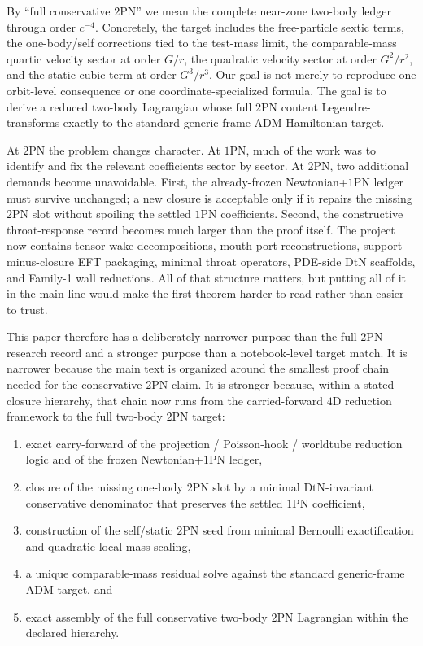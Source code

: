 \documentclass[11pt]{article}
\newcommand{\OnePN}{\mathrm{1PN}}
\newcommand{\TwoPN}{\mathrm{2PN}}
\newcommand{\ADM}{\mathrm{ADM}}
\newcommand{\DtN}{\mathrm{DtN}}
\begin{document}
By ``full conservative $2$PN'' we mean the complete near-zone two-body ledger through order $c^{-4}$.
Concretely, the target includes the free-particle sextic terms, the one-body/self corrections tied to the test-mass limit, the comparable-mass quartic velocity sector at order $G/r$, the quadratic velocity sector at order $G^2/r^2$, and the static cubic term at order $G^3/r^3$.
Our goal is not merely to reproduce one orbit-level consequence or one coordinate-specialized formula.
The goal is to derive a reduced two-body Lagrangian whose full $2$PN content Legendre-transforms exactly to the standard generic-frame $\ADM$ Hamiltonian target.

At $2$PN the problem changes character.
At $1$PN, much of the work was to identify and fix the relevant coefficients sector by sector.
At $2$PN, two additional demands become unavoidable.
First, the already-frozen Newtonian+$\OnePN$ ledger must survive unchanged; a new closure is acceptable only if it repairs the missing $2$PN slot without spoiling the settled $1$PN coefficients.
Second, the constructive throat-response record becomes much larger than the proof itself.
The project now contains tensor-wake decompositions, mouth-port reconstructions, support-minus-closure EFT packaging, minimal throat operators, PDE-side $\DtN$ scaffolds, and Family-1 wall reductions.
All of that structure matters, but putting all of it in the main line would make the first theorem harder to read rather than easier to trust.

This paper therefore has a deliberately narrower purpose than the full $2$PN research record and a stronger purpose than a notebook-level target match.
It is narrower because the main text is organized around the smallest proof chain needed for the conservative $2$PN claim.
It is stronger because, within a stated closure hierarchy, that chain now runs from the carried-forward $4$D reduction framework to the full two-body $2$PN target:
\begin{enumerate}[leftmargin=1.5em]
  \item exact carry-forward of the projection / Poisson-hook / worldtube reduction logic and of the frozen Newtonian+$\OnePN$ ledger,
  \item closure of the missing one-body $\TwoPN$ slot by a minimal $\DtN$-invariant conservative denominator that preserves the settled $1$PN coefficient,
  \item construction of the self/static $\TwoPN$ seed from minimal Bernoulli exactification and quadratic local mass scaling,
  \item a unique comparable-mass residual solve against the standard generic-frame $\ADM$ target, and
  \item exact assembly of the full conservative two-body $\TwoPN$ Lagrangian within the declared hierarchy.
\end{enumerate}
\end{document}
